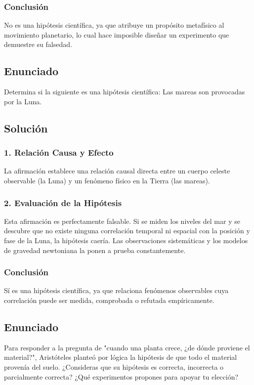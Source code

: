 \documentclass[12pt, a4paper]{article}
\begin{document}
\subsubsection*{Conclusión}
No es una hipótesis científica, ya que atribuye un propósito metafísico al movimiento planetario, lo cual hace imposible diseñar un experimento que demuestre su falsedad.

\newpage

\subsection*{Enunciado}
Determina si la siguiente es una hipótesis científica: Las mareas son provocadas por la Luna.

\subsection*{Solución}

\subsubsection*{1. Relación Causa y Efecto}
La afirmación establece una relación causal directa entre un cuerpo celeste observable (la Luna) y un fenómeno físico en la Tierra (las mareas).

\subsubsection*{2. Evaluación de la Hipótesis}
Esta afirmación es perfectamente falsable. Si se miden los niveles del mar y se descubre que no existe ninguna correlación temporal ni espacial con la posición y fase de la Luna, la hipótesis caería. Las observaciones sistemáticas y los modelos de gravedad newtoniana la ponen a prueba constantemente.

\subsubsection*{Conclusión}
Sí es una hipótesis científica, ya que relaciona fenómenos observables cuya correlación puede ser medida, comprobada o refutada empíricamente.

\newpage

\subsection*{Enunciado}
Para responder a la pregunta de "cuando una planta crece, ¿de dónde proviene el material?", Aristóteles planteó por lógica la hipótesis de que todo el material provenía del suelo. ¿Consideras que su hipótesis es correcta, incorrecta o parcialmente correcta? ¿Qué experimentos propones para apoyar tu elección?
\end{document}
